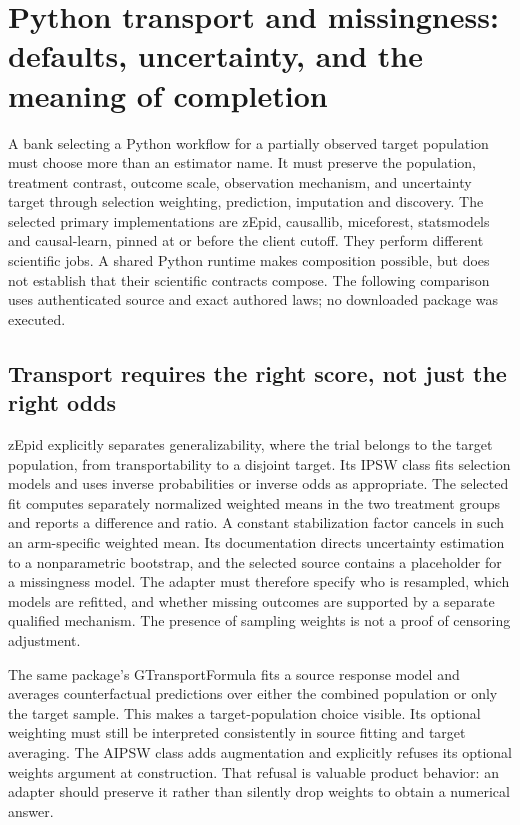 \section[Python transport and missingness contracts]{Python transport and missingness: defaults, uncertainty, and the meaning of completion}
\label{sec:exec25-ptm}

A bank selecting a Python workflow for a partially observed target population must choose more than an estimator name. It must preserve the population, treatment contrast, outcome scale, observation mechanism, and uncertainty target through selection weighting, prediction, imputation and discovery. The selected primary implementations are zEpid, causallib, miceforest, statsmodels and causal-learn, pinned at or before the client cutoff. They perform different scientific jobs. A shared Python runtime makes composition possible, but does not establish that their scientific contracts compose. The following comparison uses authenticated source and exact authored laws; no downloaded package was executed.\citep{exec25_ptm_zepid,exec25_ptm_causallib,exec25_ptm_miceforest,exec25_ptm_statsmodels,exec25_ptm_causallearn}

\subsection{Transport requires the right score, not just the right odds}

zEpid explicitly separates generalizability, where the trial belongs to the target population, from transportability to a disjoint target. Its IPSW class fits selection models and uses inverse probabilities or inverse odds as appropriate. The selected fit computes separately normalized weighted means in the two treatment groups and reports a difference and ratio. A constant stabilization factor cancels in such an arm-specific weighted mean. Its documentation directs uncertainty estimation to a nonparametric bootstrap, and the selected source contains a placeholder for a missingness model. The adapter must therefore specify who is resampled, which models are refitted, and whether missing outcomes are supported by a separate qualified mechanism. The presence of sampling weights is not a proof of censoring adjustment.\citep{exec25_ptm_zepid}

The same package's GTransportFormula fits a source response model and averages counterfactual predictions over either the combined population or only the target sample. This makes a target-population choice visible. Its optional weighting must still be interpreted consistently in source fitting and target averaging. The AIPSW class adds augmentation and explicitly refuses its optional weights argument at construction. That refusal is valuable product behavior: an adapter should preserve it rather than silently drop weights to obtain a numerical answer.\citep{exec25_ptm_zepid}

